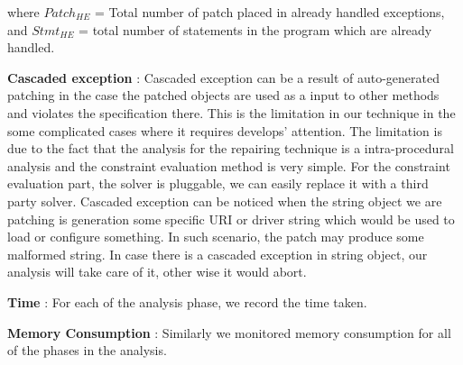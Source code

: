 \begin{mylist}
where $Patch_{HE}$ = Total number of patch placed in already handled exceptions,
and $Stmt_{HE}$ =  total number of statements in the program which are already
handled.


\item \textbf{Cascaded exception} : Cascaded exception can be a result of 
auto-generated patching in the case the patched objects are used as a input
to other methods and violates the specification there. This is the limitation
in our technique in the some complicated cases where it requires develops' 
attention. The limitation is due to the fact that the analysis for the repairing 
technique is a intra-procedural analysis and the constraint evaluation method is
very simple. For the constraint evaluation part, the solver is pluggable, we can
easily replace it with a third party solver. Cascaded exception can be noticed 
when the string object we are patching is generation some specific URI or driver
string which would be used to load or configure something. In such scenario, the
patch may produce some malformed string. In case there is a cascaded exception 
in string object, our analysis will take care of it, other wise it would abort. 

\item \textbf{Time} : For each of the analysis phase, we record the time taken.

\item \textbf{Memory Consumption} : Similarly we monitored memory consumption
for all of the phases in the analysis.

\end{mylist}


